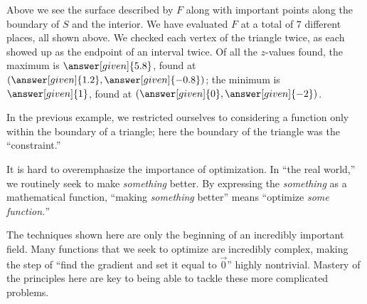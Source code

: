 \documentclass{ximera}
\begin{document}
\begin{example}
\begin{explanation}
\begin{image}
    \end{image}
    Above we see the surface described by $F$ along with important
    points along the boundary of $S$ and the interior.  We have
    evaluated $F$ at a total of $7$ different places, all shown
    above. We checked each vertex of the triangle twice, as each
    showed up as the endpoint of an interval twice. Of all the
    $z$-values found, the maximum is $\answer[given]{5.8}$, found at
    $\left(\answer[given]{1.2},\answer[given]{-0.8}\right)$; the
    minimum is $\answer[given]{1}$, found at
    $(\answer[given]{0},\answer[given]{-2})$.
  \end{explanation}
\end{example}






In the previous example, we restricted ourselves
to considering a function only within the boundary of a triangle; here
the boundary of the triangle was the ``constraint.''




      
It is hard to overemphasize the importance of optimization. In ``the
real world,'' we routinely seek to make \textit{something} better. By
expressing the \textit{something} as a mathematical function, ``making
\textit{something} better'' means ``optimize \textit{some function.}''
      
The techniques shown here are only the beginning of an incredibly
important field. Many functions that we seek to optimize are
incredibly complex, making the step of ``find the gradient and set it
equal to $\vec 0$'' highly nontrivial. Mastery of the principles here
are key to being able to tackle these more complicated problems.
\end{document}
